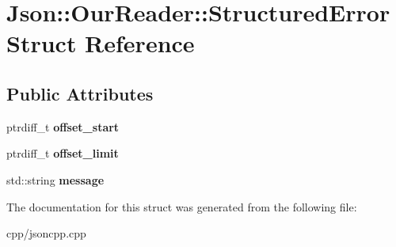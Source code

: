 \hypertarget{struct_json_1_1_our_reader_1_1_structured_error}{}\section{Json\+:\+:Our\+Reader\+:\+:Structured\+Error Struct Reference}
\label{struct_json_1_1_our_reader_1_1_structured_error}
\subsection*{Public Attributes}
\begin{DoxyCompactItemize}
\item 
\mbox{\label{struct_json_1_1_our_reader_1_1_structured_error_a102677698afb8177c985e72dafe72b15}} 
ptrdiff\+\_\+t {\bfseries offset\+\_\+start}
\item 
\mbox{\label{struct_json_1_1_our_reader_1_1_structured_error_a15491a751a39c5153af04e68b1d0abb9}} 
ptrdiff\+\_\+t {\bfseries offset\+\_\+limit}
\item 
\mbox{\label{struct_json_1_1_our_reader_1_1_structured_error_adc8a757b6452cc6ab14fb90b933b3414}} 
std\+::string {\bfseries message}
\end{DoxyCompactItemize}


The documentation for this struct was generated from the following file\+:\begin{DoxyCompactItemize}
\item 
cpp/jsoncpp.\+cpp\end{DoxyCompactItemize}
